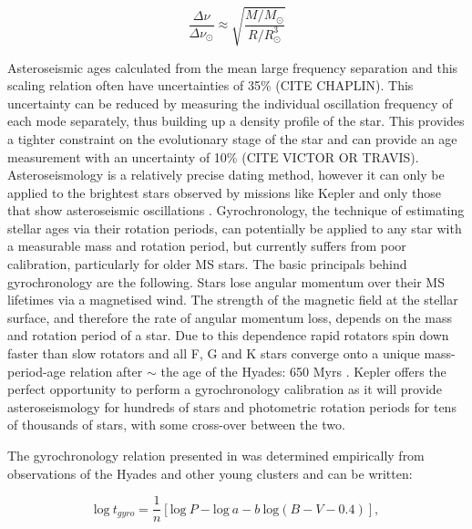 \documentclass[12pt,preprint]{aastex}
\begin{document}
\begin{equation}
\frac{\Delta\nu}{\Delta\nu_{\odot}} \approx \sqrt{\frac{M/M_{\odot}}{R/R_{\odot}^3}}
\label{eq:delta_nu}
\end{equation}


Asteroseismic ages calculated from the mean large frequency separation and this scaling relation often have uncertainties of  35\% (CITE CHAPLIN).
This uncertainty can be reduced by measuring the individual oscillation frequency of each mode separately, thus building up a density profile of the star. 
This provides a tighter constraint on the evolutionary stage of the star and can provide an age measurement with an uncertainty of 10\% (CITE VICTOR OR TRAVIS).
Asteroseismology is a relatively precise dating method, however it can only be applied to the brightest stars observed by missions like Kepler and only those that show asteroseismic
oscillations \citep{Chaplin_2011}. 
Gyrochronology, the technique of estimating stellar ages via their rotation periods, can potentially be applied to any star with a measurable mass and rotation period, but currently suffers from poor calibration, particularly for older
MS stars. 
The basic principals behind gyrochronology are the following. 
Stars lose angular momentum over their MS lifetimes via a magnetised wind. 
The strength of the magnetic field at the stellar surface, and
 therefore the rate of angular momentum loss, depends on the mass and
 rotation period of a star. 
 Due to this dependence rapid rotators spin
 down faster than slow rotators and all F, G and K stars converge onto
 a unique mass-period-age relation after $\sim$ the age of the Hyades: 650 Myrs \citep{Irwin_2009}.
Kepler offers the perfect opportunity to perform a
gyrochronology calibration as it will provide asteroseismology for
hundreds of stars and photometric rotation periods for tens of
thousands of stars, with some cross-over between the two.

The gyrochronology relation presented in \citet{Barnes_2007} was determined empirically
from observations of the Hyades and other young clusters and can be written:



\begin{equation}
\mbox{log}~ t_{gyro} = \frac{1}{n}\left[\mbox{log}~ P - \mbox{log}~ a - b~\mbox{log}(B-V-0.4)\right] ,
\label{eq:Barnes2007_2}
\end{equation}
\end{document}
